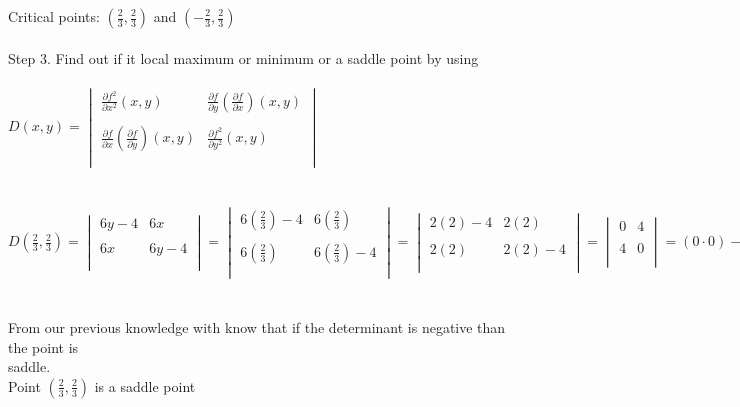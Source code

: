 \documentclass{article}
\begin{document}
\begin{enumerate}[14.]
Critical points: $(\frac{2}{3},\frac{2}{3})$ and $(-\frac{2}{3},\frac{2}{3})$
\\
\\
Step 3. Find out if it local maximum or minimum or a saddle point by using \\\\ $D(x,y)= \begin{vmatrix}
\frac{\partial{f^{2}}}{\partial{x^{2}}}(x,y)&\frac{\partial{f}}{\partial{y}}(\frac{\partial{f}}{\partial{x}})(x,y)\\\\
\frac{\partial{f}}{\partial{x}}(\frac{\partial{f}}{\partial{y}})(x,y)&\frac{\partial{f^{2}}}{\partial{y^{2}}}(x,y)\\\\
\end{vmatrix}$\\
\\
\\
$D(\frac{2}{3},\frac{2}{3})= \begin{vmatrix}
6y-4&6x\\\\
6x&6y-4\\\\
\end{vmatrix}=\begin{vmatrix}
6(\frac{2}{3})-4&6(\frac{2}{3})\\\\
6(\frac{2}{3})&6(\frac{2}{3})-4\\\\
\end{vmatrix}=\begin{vmatrix}
2(2)-4&2(2)\\\\
2(2)&2(2)-4\\\\
\end{vmatrix}=\begin{vmatrix}
0&4\\\\
4&0\\\\
\end{vmatrix}=(0\cdot0)-(4\cdot4)=0-16=-16$
\\
\\
\\
From our previous knowledge with know that if the determinant is negative than the point is\\
saddle. 
\\Point $(\frac{2}{3},\frac{2}{3})$ is a saddle point\\

\end{enumerate}
\end{document}
